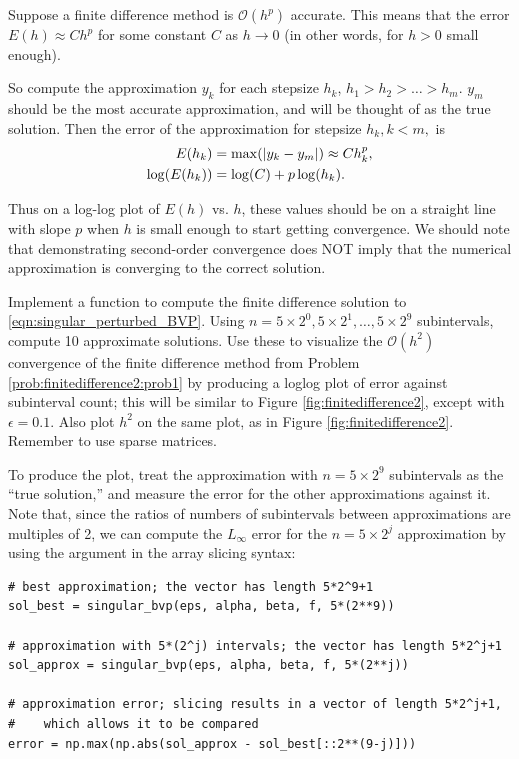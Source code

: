 Suppose a finite difference method is $\mathcal{O}(h^p)$ accurate.
This means that the error $E(h) \approx Ch^p$ for some constant $C$ as $h \to 0$ (in other words, for $h>0$ small enough).

So compute the approximation $y_k$ for each stepsize $h_k$, $h_1 > h_2> \ldots>h_m$.
$y_m$ should be the most accurate approximation, and will be thought of as the true solution.
Then the error of the approximation for
stepsize $h_k, k < m,$ is
\begin{align*}
	E(h_k) &= \max( \left\lvert y_k - y_m\right\rvert) \approx C h_k^p ,\\
	\log(E(h_k)) &= \log(C) + p \log(h_k).
\end{align*}

Thus on a log-log plot of $E(h)$ vs. $h$, these values should be on a straight line with slope $p$ when $h$ is small enough to start getting convergence.
We should note that demonstrating second-order convergence does NOT imply that the numerical approximation is converging to the correct solution.


\begin{problem}
Implement a function  to compute the finite difference solution to \eqref{eqn:singular_perturbed_BVP}.
Using $n = 5 \times 2^0,5 \times 2^1, \dots ,5 \times 2^9$ subintervals, compute 10 approximate solutions.
Use these to visualize the $\mathcal{O}(h^2)$ convergence of the finite difference method from Problem \ref{prob:finitedifference2:prob1} by producing a loglog plot of error against subinterval count; this will be similar to Figure \ref{fig:finitedifference2}, except with $\epsilon=0.1$.
Also plot $h^2$ on the same plot, as in Figure \ref{fig:finitedifference2}.
Remember to use sparse matrices.

To produce the plot, treat the approximation with $n = 5 \times 2^9$ subintervals as the ``true solution,'' and measure the error for the other approximations against it.
Note that, since the ratios of numbers of subintervals between approximations are multiples of 2, we can compute the $L_{\infty}$ error for the $n=5 \times 2^j$ approximation by using the  argument in the array slicing syntax:
\begin{lstlisting}
# best approximation; the vector has length 5*2^9+1
sol_best = singular_bvp(eps, alpha, beta, f, 5*(2**9))

# approximation with 5*(2^j) intervals; the vector has length 5*2^j+1
sol_approx = singular_bvp(eps, alpha, beta, f, 5*(2**j))

# approximation error; slicing results in a vector of length 5*2^j+1,
#    which allows it to be compared
error = np.max(np.abs(sol_approx - sol_best[::2**(9-j)]))
\end{lstlisting}
\end{problem}

